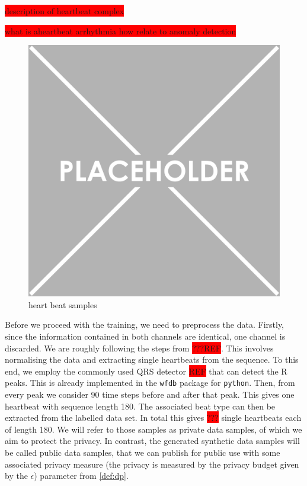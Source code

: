 \colorbox{red}{description of heartbeat complex}

\colorbox{red}{what is aheartbeat arrhythmia how relate to anomaly detection}

\begin{figure}[h]
    \centering
    \includegraphics[scale=0.5]{../images/placeholder.png}
    \caption{heart beat samples}
\end{figure}

Before we proceed with the training, we need to preprocess the data. Firstly, since the information contained in both channels are identical, one channel is discarded. We are roughly following the steps from \colorbox{red}{???REF}. This involves normalising the data and extracting single heartbeats from the sequence. To this end, we employ the commonly used QRS detector \colorbox{red}{REF} that can detect the R peaks. This is already implemented in the \texttt{wfdb} package for \texttt{python}. Then, from every peak we consider 90 time steps before and after that peak. This gives one heartbeat with sequence length 180. The associated beat type can then be extracted from the labelled data set. In total this gives \colorbox{red}{???} single heartbeats each of length 180. We will refer to those samples as private data samples, of which we aim to protect the privacy. In contrast, the generated synthetic data samples will be called public data samples, that we can publish for public use with some associated privacy measure (the privacy is measured by the privacy budget given by the \(\epsilon\)) parameter from \cref{def:dp}.

